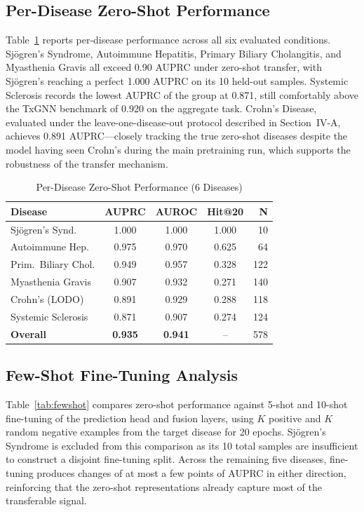 \documentclass[conference]{IEEEtran}
\begin{document}
\subsection{Per-Disease Zero-Shot Performance}

Table~\ref{tab:per_disease} reports per-disease performance across all six evaluated conditions. Sj\"{o}gren's Syndrome, Autoimmune Hepatitis, Primary Biliary Cholangitis, and Myasthenia Gravis all exceed 0.90 AUPRC under zero-shot transfer, with Sj\"{o}gren's reaching a perfect 1.000 AUPRC on its 10 held-out samples. Systemic Sclerosis records the lowest AUPRC of the group at 0.871, still comfortably above the TxGNN benchmark of 0.920 on the aggregate task. Crohn's Disease, evaluated under the leave-one-disease-out protocol described in Section~IV-A, achieves 0.891 AUPRC---closely tracking the true zero-shot diseases despite the model having seen Crohn's during the main pretraining run, which supports the robustness of the transfer mechanism.

\begin{table}[!t]
\caption{Per-Disease Zero-Shot Performance (6 Diseases)}
\label{tab:per_disease}
\centering
\footnotesize
\renewcommand{\arraystretch}{1.4}
\begin{tabular}{p{2.3cm}cccr}
\toprule
\textbf{Disease} & \textbf{AUPRC} & \textbf{AUROC} & \textbf{Hit@20} & \textbf{N} \\
\midrule
Sj\"{o}gren's Synd. & 1.000 & 1.000 & 1.000 & 10 \\
Autoimmune Hep. & 0.975 & 0.970 & 0.625 & 64 \\
Prim.\ Biliary Chol. & 0.949 & 0.957 & 0.328 & 122 \\
Myasthenia Gravis & 0.907 & 0.932 & 0.271 & 140 \\
Crohn's (LODO) & 0.891 & 0.929 & 0.288 & 118 \\
Systemic Sclerosis & 0.871 & 0.907 & 0.274 & 124 \\
\midrule
\textbf{Overall} & \textbf{0.935} & \textbf{0.941} & -- & 578 \\
\bottomrule
\end{tabular}
\end{table}

\subsection{Few-Shot Fine-Tuning Analysis}

Table~\ref{tab:fewshot} compares zero-shot performance against 5-shot and 10-shot fine-tuning of the prediction head and fusion layers, using $K$ positive and $K$ random negative examples from the target disease for 20 epochs. Sj\"{o}gren's Syndrome is excluded from this comparison as its 10 total samples are insufficient to construct a disjoint fine-tuning split. Across the remaining five diseases, fine-tuning produces changes of at most a few points of AUPRC in either direction, reinforcing that the zero-shot representations already capture most of the transferable signal.
\end{document}

